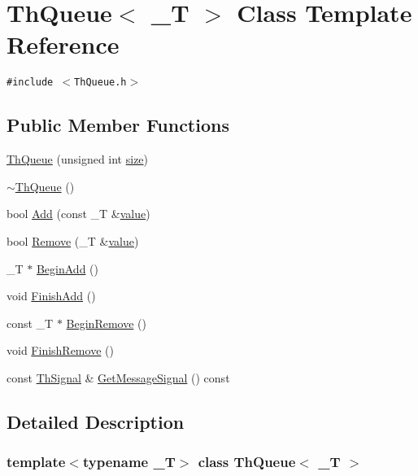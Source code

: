 \hypertarget{class_th_queue}{
\section{ThQueue$<$ \_\-T $>$ Class Template Reference}
\label{class_th_queue}
}
{\tt \#include $<$ThQueue.h$>$}

\subsection*{Public Member Functions}
\begin{CompactItemize}
\item 
\hyperlink{class_th_queue_6110171ecc9891a3d485b993ec4c14d2}{ThQueue} (unsigned int \hyperlink{glext__bak_8h_3d1e3edfcf61ca2d831883e1afbad89e}{size})
\item 
\hyperlink{class_th_queue_b32a990df6751f082db18f3c2cbcb8b8}{$\sim$ThQueue} ()
\item 
bool \hyperlink{class_th_queue_fd43d1b440516fbf12ebc68e6163180d}{Add} (const \_\-T \&\hyperlink{glext__bak_8h_6a4f8a1a444e9080b297963b3db29fe0}{value})
\item 
bool \hyperlink{class_th_queue_a4f3c29b0686392b3451ca96b5d8b892}{Remove} (\_\-T \&\hyperlink{glext__bak_8h_6a4f8a1a444e9080b297963b3db29fe0}{value})
\item 
\_\-T $\ast$ \hyperlink{class_th_queue_39799c63788fc9dbbcf444faf58b7dad}{BeginAdd} ()
\item 
void \hyperlink{class_th_queue_45d8ee9095febd417352f8ede4cac5d7}{FinishAdd} ()
\item 
const \_\-T $\ast$ \hyperlink{class_th_queue_1afa8d302d631714581a2c98c4735582}{BeginRemove} ()
\item 
void \hyperlink{class_th_queue_1847a76ebb7b75997e17711a019d87b1}{FinishRemove} ()
\item 
const \hyperlink{class_th_signal}{ThSignal} \& \hyperlink{class_th_queue_9691f2334e353fd22d977b4b47e116c5}{GetMessageSignal} () const 
\end{CompactItemize}


\subsection{Detailed Description}
\subsubsection*{template$<$typename \_\-T$>$ class ThQueue$<$ \_\-T $>$}



